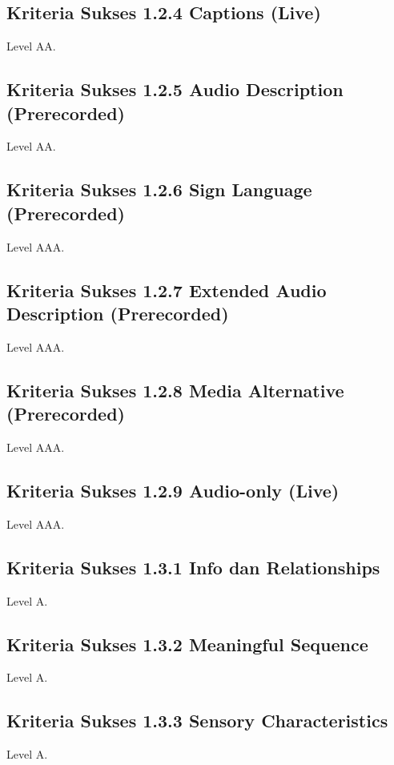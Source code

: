 \subsection{Kriteria Sukses 1.2.4 Captions (Live)}
\label{sec:kriteria_1.2.4}
Level AA.

\subsection{Kriteria Sukses 1.2.5 Audio Description (Prerecorded)}
\label{sec:kriteria_1.2.5}
Level AA.

\subsection{Kriteria Sukses 1.2.6 Sign Language (Prerecorded)}
\label{sec:kriteria_1.2.6}
Level AAA.

\subsection{Kriteria Sukses 1.2.7 Extended Audio Description (Prerecorded)}
\label{sec:kriteria_1.2.7}
Level AAA.

\subsection{Kriteria Sukses 1.2.8 Media Alternative (Prerecorded)}
\label{sec:kriteria_1.2.8}
Level AAA.

\subsection{Kriteria Sukses 1.2.9 Audio-only (Live)}
\label{sec:kriteria_1.2.9}
Level AAA.

\subsection{Kriteria Sukses 1.3.1 Info dan Relationships}
\label{sec:kriteria_1.3.1}
Level A.

\subsection{Kriteria Sukses 1.3.2 Meaningful Sequence}
\label{sec:kriteria_1.3.2}
Level A.

\subsection{Kriteria Sukses 1.3.3 Sensory Characteristics}
\label{sec:kriteria_1.3.3}
Level A.

